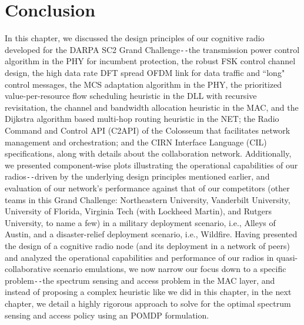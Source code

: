 \section{Conclusion}\label{B.V}
In this chapter, we discussed the design principles of our cognitive radio developed for the DARPA SC2 Grand Challenge\texttt{-{}-}the transmission power control algorithm in the PHY for incumbent protection, the robust FSK control channel design, the high data rate DFT spread OFDM link for data traffic and ``long" control messages, the MCS adaptation algorithm in the PHY, the prioritized value-per-resource flow scheduling heuristic in the DLL with recursive revisitation, the channel and bandwidth allocation heuristic in the MAC, and the Dijkstra algorithm based multi-hop routing heuristic in the NET; the Radio Command and Control API (C2API) of the Colosseum that facilitates network management and orchestration; and the CIRN Interface Language (CIL) specifications, along with details about the collaboration network. Additionally, we presented component-wise plots illustrating the operational capabilities of our radios\texttt{-{}-}driven by the underlying design principles mentioned earlier, and evaluation of our network's performance against that of our competitors (other teams in this Grand Challenge: Northeastern University, Vanderbilt University, University of Florida, Virginia Tech (with Lockheed Martin), and Rutgers University, to name a few) in a military deployment scenario, i.e., Alleys of Austin, and a disaster-relief deployment scenario, i.e., Wildfire. Having presented the design of a cognitive radio node (and its deployment in a network of peers) and analyzed the operational capabilities and performance of our radios in quasi-collaborative scenario emulations, we now narrow our focus down to a specific problem\texttt{-{}-}the spectrum sensing and access problem in the MAC layer, and instead of proposing a complex heuristic like we did in this chapter, in the next chapter, we detail a highly rigorous approach to solve for the optimal spectrum sensing and access policy using an POMDP formulation.